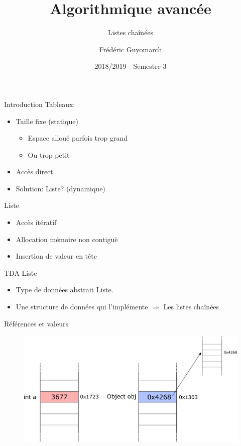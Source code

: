 \documentclass[12pt,a4paper]{beamer}
\title{\textbf{Algorithmique avancée}}
\subtitle{Listes chaînées}
\author{Frédéric Guyomarch}
\date{2018/2019 - Semestre 3}
\institute %
{

  Université de Lille1\\
  IUT-A de Lille

}
\begin{document}
\begin{frame}
\titlepage
\end{frame}

\begin{frame}{Introduction}
Tableaux:
\begin{itemize}
\item Taille fixe (statique)
\begin{itemize}
\item Espace alloué parfois trop grand
\item Ou trop petit
\end{itemize}
\item Accès direct
\item Solution: Liste? (dynamique)
\end{itemize}

\end{frame}

\begin{frame}{Liste}
\begin{itemize}
\item Accès itératif
\item Allocation mémoire non contiguë
\item Insertion de valeur en tête
\end{itemize}
\end{frame}

\begin{frame}{TDA Liste}
\begin{itemize}
\item Type de données abstrait Liste.
\item Une structure de données qui l'implémente $\Rightarrow$
Les listes chaînées

\end{itemize}

\end{frame}

\begin{frame}{Références et valeurs}

\begin{figure}
\includegraphics[scale=0.3]{figs/memoire}
\end{figure}
\end{frame}
\end{document}
